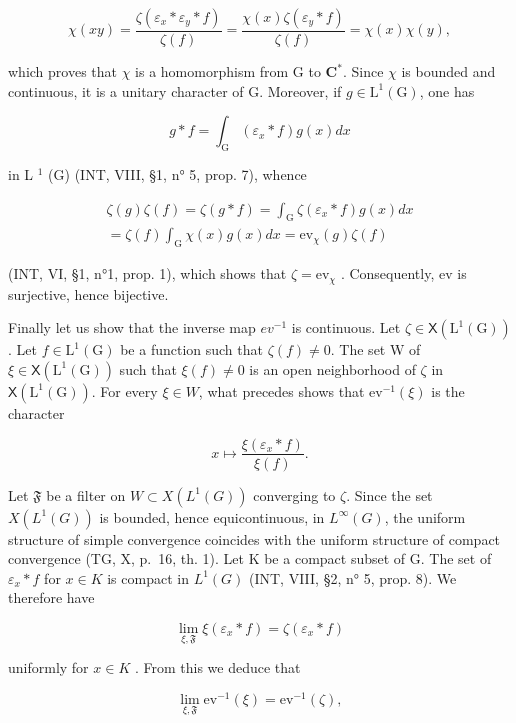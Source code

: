 \[
\chi (x y) = \frac {\zeta (\varepsilon_ {x} * \varepsilon_ {y} * f)}{\zeta (f)} = \frac {\chi (x) \zeta (\varepsilon_ {y} * f)}{\zeta (f)} = \chi (x) \chi (y),
\]

which proves that \(\chi\) is a homomorphism from G to \(\mathbf{C}^*\). Since \(\chi\) is bounded and continuous, it is a unitary character of G. Moreover, if \(g \in \mathrm{L}^{1}(\mathrm{G})\), one has

\[
g * f = \int_ {\mathrm{G}} (\varepsilon_ {x} * f) g (x) d x
\]

in L \(^{1}\) (G) (INT, VIII, §1, n° 5, prop. 7), whence

\[
\begin{array}{c} \zeta (g) \zeta (f) = \zeta (g * f) = \int_ {\mathrm{G}} \zeta (\varepsilon_ {x} * f) g (x) d x \\ = \zeta (f) \int_ {\mathrm{G}} \chi (x) g (x) d x = \mathrm{ev} _ {\chi} (g) \zeta (f) \end{array}
\]

(INT, VI, §1, n°1, prop. 1), which shows that \(\zeta = \mathrm{ev}_{\chi}\) . Consequently, ev is surjective, hence bijective.

Finally let us show that the inverse map \(ev^{-1}\) is continuous. Let \(\zeta \in \mathsf{X}(\mathrm{L}^{1}(\mathrm{G}))\). Let \(f \in \mathrm{L}^{1}(\mathrm{G})\) be a function such that \(\zeta(f) \neq 0\). The set W of \(\xi \in \mathsf{X}(\mathrm{L}^{1}(\mathrm{G}))\) such that \(\xi(f) \neq 0\) is an open neighborhood of \(\zeta\) in \(\mathsf{X}(\mathrm{L}^{1}(\mathrm{G}))\). For every \(\xi \in W\), what precedes shows that \(\mathrm{ev}^{-1}(\xi)\) is the character

\[
x \mapsto \frac {\xi (\varepsilon_ {x} * f)}{\xi (f)}.
\]

Let \(\mathfrak{F}\) be a filter on \(W \subset X(L^{1}(G))\) converging to \(\zeta\). Since the set \(X(L^{1}(G))\) is bounded, hence equicontinuous, in \(L^{\infty}(G)\), the uniform structure of simple convergence coincides with the uniform structure of compact convergence (TG, X, p.~16, th. 1). Let K be a compact subset of G. The set of \(\varepsilon_{x} * f\) for \(x \in K\) is compact in \(L^{1}(G)\) (INT, VIII, §2, n° 5, prop. 8). We therefore have

\[
\lim _ {\xi , \mathfrak {F}} \xi (\varepsilon_ {x} * f) = \zeta (\varepsilon_ {x} * f)
\]

uniformly for \(x \in K\) . From this we deduce that

\[
\lim _ {\xi , \mathfrak {F}} \mathrm{ev} ^ {- 1} (\xi) = \mathrm{ev} ^ {- 1} (\zeta),
\]


